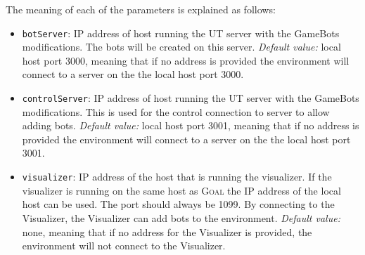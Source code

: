 \documentclass[11pt,a4paper]{article}
\newcommand{\Goal}{\textsc{Goal}}
\begin{document}
\noindent The meaning of each of the parameters is explained as follows:
\begin{itemize}


	\item \texttt{botServer}: IP address of host running the UT server with the GameBots modifications. The bots will be created on this server. \textit{Default value:} local host port 3000, meaning that if no address is provided the environment will connect to a server on the the local host port 3000.
	\item \texttt{controlServer}: IP address of host running the UT server with the GameBots modifications. This is used for the control connection to server to allow adding bots. \textit{Default value:} local host port 3001, meaning that if no address is provided the environment will connect to a server on the the local host port 3001.
	\item \texttt{visualizer}: IP address of the host that is running the visualizer. If the visualizer is running on the same host as {\Goal} the IP address of the local host can be used. The port should always be 1099. By connecting to the Visualizer, the Visualizer can add bots to the environment. \textit{Default value:} none, meaning that if no address for the Visualizer is provided, the environment will not connect to the Visualizer.


\end{itemize}
\end{document}
